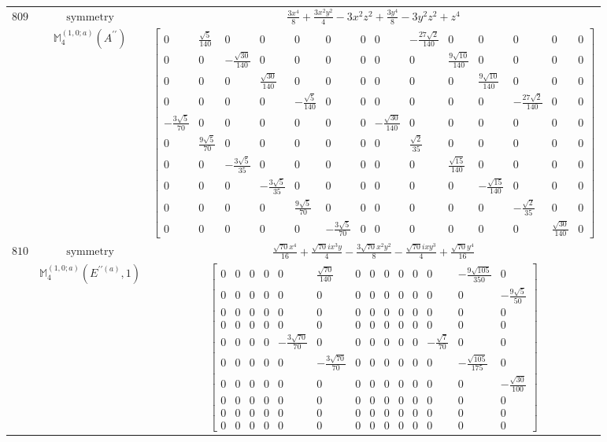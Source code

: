 \documentclass[fleqn,8pt,landscape]{jsarticle}
\begin{document}
\begin{longtable}{ccc}
$ 809 $ & $ \text{symmetry} $ & $ \frac{3 x^{4}}{8} + \frac{3 x^{2} y^{2}}{4} - 3 x^{2} z^{2} + \frac{3 y^{4}}{8} - 3 y^{2} z^{2} + z^{4} $ \\
$  $ & $ \mathbb{M}_{4}^{(1,0;a)}(A^{\prime\prime}) $ & $ \begin{bmatrix} 0 & \frac{\sqrt{5}}{140} & 0 & 0 & 0 & 0 & 0 & 0 & - \frac{27 \sqrt{2}}{140} & 0 & 0 & 0 & 0 & 0 \\ 0 & 0 & - \frac{\sqrt{30}}{140} & 0 & 0 & 0 & 0 & 0 & 0 & \frac{9 \sqrt{10}}{140} & 0 & 0 & 0 & 0 \\ 0 & 0 & 0 & \frac{\sqrt{30}}{140} & 0 & 0 & 0 & 0 & 0 & 0 & \frac{9 \sqrt{10}}{140} & 0 & 0 & 0 \\ 0 & 0 & 0 & 0 & - \frac{\sqrt{5}}{140} & 0 & 0 & 0 & 0 & 0 & 0 & - \frac{27 \sqrt{2}}{140} & 0 & 0 \\ - \frac{3 \sqrt{5}}{70} & 0 & 0 & 0 & 0 & 0 & 0 & - \frac{\sqrt{30}}{140} & 0 & 0 & 0 & 0 & 0 & 0 \\ 0 & \frac{9 \sqrt{5}}{70} & 0 & 0 & 0 & 0 & 0 & 0 & \frac{\sqrt{2}}{35} & 0 & 0 & 0 & 0 & 0 \\ 0 & 0 & - \frac{3 \sqrt{5}}{35} & 0 & 0 & 0 & 0 & 0 & 0 & \frac{\sqrt{15}}{140} & 0 & 0 & 0 & 0 \\ 0 & 0 & 0 & - \frac{3 \sqrt{5}}{35} & 0 & 0 & 0 & 0 & 0 & 0 & - \frac{\sqrt{15}}{140} & 0 & 0 & 0 \\ 0 & 0 & 0 & 0 & \frac{9 \sqrt{5}}{70} & 0 & 0 & 0 & 0 & 0 & 0 & - \frac{\sqrt{2}}{35} & 0 & 0 \\ 0 & 0 & 0 & 0 & 0 & - \frac{3 \sqrt{5}}{70} & 0 & 0 & 0 & 0 & 0 & 0 & \frac{\sqrt{30}}{140} & 0 \end{bmatrix} $ \\ \hline
$ 810 $ & $ \text{symmetry} $ & $ \frac{\sqrt{70} x^{4}}{16} + \frac{\sqrt{70} i x^{3} y}{4} - \frac{3 \sqrt{70} x^{2} y^{2}}{8} - \frac{\sqrt{70} i x y^{3}}{4} + \frac{\sqrt{70} y^{4}}{16} $ \\
$  $ & $ \mathbb{M}_{4}^{(1,0;a)}(E^{\prime\prime(a)},1) $ & $ \begin{bmatrix} 0 & 0 & 0 & 0 & 0 & \frac{\sqrt{70}}{140} & 0 & 0 & 0 & 0 & 0 & 0 & - \frac{9 \sqrt{105}}{350} & 0 \\ 0 & 0 & 0 & 0 & 0 & 0 & 0 & 0 & 0 & 0 & 0 & 0 & 0 & - \frac{9 \sqrt{5}}{50} \\ 0 & 0 & 0 & 0 & 0 & 0 & 0 & 0 & 0 & 0 & 0 & 0 & 0 & 0 \\ 0 & 0 & 0 & 0 & 0 & 0 & 0 & 0 & 0 & 0 & 0 & 0 & 0 & 0 \\ 0 & 0 & 0 & 0 & - \frac{3 \sqrt{70}}{70} & 0 & 0 & 0 & 0 & 0 & 0 & - \frac{\sqrt{7}}{70} & 0 & 0 \\ 0 & 0 & 0 & 0 & 0 & - \frac{3 \sqrt{70}}{70} & 0 & 0 & 0 & 0 & 0 & 0 & - \frac{\sqrt{105}}{175} & 0 \\ 0 & 0 & 0 & 0 & 0 & 0 & 0 & 0 & 0 & 0 & 0 & 0 & 0 & - \frac{\sqrt{30}}{100} \\ 0 & 0 & 0 & 0 & 0 & 0 & 0 & 0 & 0 & 0 & 0 & 0 & 0 & 0 \\ 0 & 0 & 0 & 0 & 0 & 0 & 0 & 0 & 0 & 0 & 0 & 0 & 0 & 0 \\ 0 & 0 & 0 & 0 & 0 & 0 & 0 & 0 & 0 & 0 & 0 & 0 & 0 & 0 \end{bmatrix} $ \\ \hline

\end{longtable}
\end{document}
